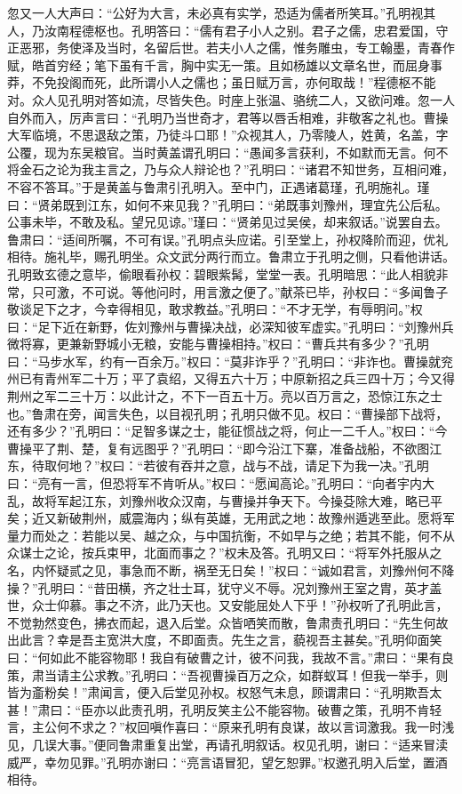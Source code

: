 忽又一人大声曰：“公好为大言，未必真有实学，恐适为儒者所笑耳。”孔明视其人，乃汝南程德枢也。孔明答曰：“儒有君子小人之别。君子之儒，忠君爱国，守正恶邪，务使泽及当时，名留后世。若夫小人之儒，惟务雕虫，专工翰墨，青春作赋，皓首穷经；笔下虽有千言，胸中实无一策。且如杨雄以文章名世，而屈身事莽，不免投阁而死，此所谓小人之儒也；虽日赋万言，亦何取哉！”程德枢不能对。众人见孔明对答如流，尽皆失色。时座上张温、骆统二人，又欲问难。忽一人自外而入，厉声言曰：“孔明乃当世奇才，君等以唇舌相难，非敬客之礼也。曹操大军临境，不思退敌之策，乃徒斗口耶！”众视其人，乃零陵人，姓黄，名盖，字公覆，现为东吴粮官。当时黄盖谓孔明曰：“愚闻多言获利，不如默而无言。何不将金石之论为我主言之，乃与众人辩论也？”孔明曰：“诸君不知世务，互相问难，不容不答耳。”于是黄盖与鲁肃引孔明入。至中门，正遇诸葛瑾，孔明施礼。瑾曰：“贤弟既到江东，如何不来见我？”孔明曰：“弟既事刘豫州，理宜先公后私。公事未毕，不敢及私。望兄见谅。”瑾曰：“贤弟见过吴侯，却来叙话。”说罢自去。鲁肃曰：“适间所嘱，不可有误。”孔明点头应诺。引至堂上，孙权降阶而迎，优礼相待。施礼毕，赐孔明坐。众文武分两行而立。鲁肃立于孔明之侧，只看他讲话。孔明致玄德之意毕，偷眼看孙权：碧眼紫髯，堂堂一表。孔明暗思：“此人相貌非常，只可激，不可说。等他问时，用言激之便了。”献茶已毕，孙权曰：“多闻鲁子敬谈足下之才，今幸得相见，敢求教益。”孔明曰：“不才无学，有辱明问。”权曰：“足下近在新野，佐刘豫州与曹操决战，必深知彼军虚实。”孔明曰：“刘豫州兵微将寡，更兼新野城小无粮，安能与曹操相持。”权曰：“曹兵共有多少？”孔明曰：“马步水军，约有一百余万。”权曰：“莫非诈乎？”孔明曰：“非诈也。曹操就兖州已有青州军二十万；平了袁绍，又得五六十万；中原新招之兵三四十万；今又得荆州之军二三十万：以此计之，不下一百五十万。亮以百万言之，恐惊江东之士也。”鲁肃在旁，闻言失色，以目视孔明；孔明只做不见。权曰：“曹操部下战将，还有多少？”孔明曰：“足智多谋之士，能征惯战之将，何止一二千人。”权曰：“今曹操平了荆、楚，复有远图乎？”孔明曰：“即今沿江下寨，准备战船，不欲图江东，待取何地？”权曰：“若彼有吞并之意，战与不战，请足下为我一决。”孔明曰：“亮有一言，但恐将军不肯听从。”权曰：“愿闻高论。”孔明曰：“向者宇内大乱，故将军起江东，刘豫州收众汉南，与曹操并争天下。今操芟除大难，略已平矣；近又新破荆州，威震海内；纵有英雄，无用武之地：故豫州遁逃至此。愿将军量力而处之：若能以吴、越之众，与中国抗衡，不如早与之绝；若其不能，何不从众谋士之论，按兵束甲，北面而事之？”权未及答。孔明又曰：“将军外托服从之名，内怀疑贰之见，事急而不断，祸至无日矣！”权曰：“诚如君言，刘豫州何不降操？”孔明曰：“昔田横，齐之壮士耳，犹守义不辱。况刘豫州王室之胄，英才盖世，众士仰慕。事之不济，此乃天也。又安能屈处人下乎！”孙权听了孔明此言，不觉勃然变色，拂衣而起，退入后堂。众皆哂笑而散，鲁肃责孔明曰：“先生何故出此言？幸是吾主宽洪大度，不即面责。先生之言，藐视吾主甚矣。”孔明仰面笑曰：“何如此不能容物耶！我自有破曹之计，彼不问我，我故不言。”肃曰：“果有良策，肃当请主公求教。”孔明曰：“吾视曹操百万之众，如群蚁耳！但我一举手，则皆为齑粉矣！”肃闻言，便入后堂见孙权。权怒气未息，顾谓肃曰：“孔明欺吾太甚！”肃曰：“臣亦以此责孔明，孔明反笑主公不能容物。破曹之策，孔明不肯轻言，主公何不求之？”权回嗔作喜曰：“原来孔明有良谋，故以言词激我。我一时浅见，几误大事。”便同鲁肃重复出堂，再请孔明叙话。权见孔明，谢曰：“适来冒渎威严，幸勿见罪。”孔明亦谢曰：“亮言语冒犯，望乞恕罪。”权邀孔明入后堂，置酒相待。

